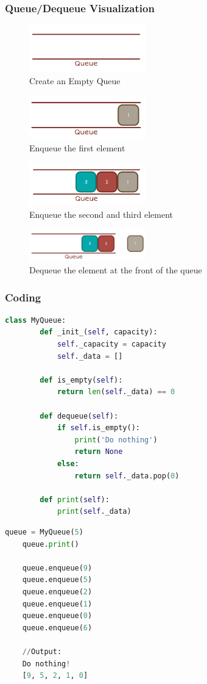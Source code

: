 \subsubsection{Queue/Dequeue Visualization}
\begin{figure}[H]
	\centering
	\includegraphics[width=0.45\textwidth]{figures/empty-queue}
	\caption{Create an Empty Queue}
\end{figure}
\begin{figure}[H]
	\centering
	\includegraphics[width=0.45\textwidth]{figures/queue-1}
	\caption{Enqueue the first element}
\end{figure}
\begin{figure}[H]
	\centering
	\includegraphics[width=0.45\textwidth]{figures/queue-2-3}
	\caption{Enqueue the second and third element}
\end{figure}
\begin{figure}[H]
	\centering
	\includegraphics[width=0.45\textwidth]{figures/dequeue}
	\caption{Dequeue the element at the front of the queue}
\end{figure}

\subsubsection{Coding}
\begin{lstlisting}[language = python, caption={Define Queue data structure class}]
	class MyQueue:
		def _init_(self, capacity):
			self._capacity = capacity
			self._data = []
		
		def is_empty(self):
			return len(self._data) == 0
			
		def dequeue(self):
			if self.is_empty():
				print('Do nothing')
				return None	
			else: 
				return self._data.pop(0)
		
		def print(self):
			print(self._data)
\end{lstlisting}

\begin{lstlisting}[language = python, caption={Example}]
	queue = MyQueue(5)
	queue.print()
	
	queue.enqueue(9)
	queue.enqueue(5)
	queue.enqueue(2)
	queue.enqueue(1)
	queue.enqueue(0)
	queue.enqueue(6)
	
	//Output:
	Do nothing!
	[9, 5, 2, 1, 0]
\end{lstlisting}

